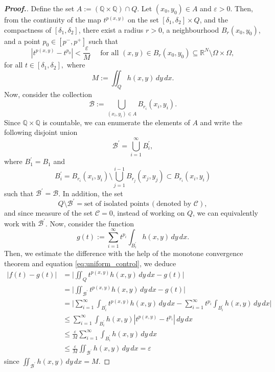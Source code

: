 \documentclass[11pt]{article}
\newcommand{\Q}{\textit{Q}}
\newcommand{\ds} {\displaystyle}
\begin{document}
\begin{proof}[\bf Proof.]
Define the set
$
A := (\mathbb{Q} \times \mathbb{Q}) \cap \Q.
$
Let \( (x_0, y_0) \in A \) and 
$\varepsilon > 0.$
Then, from the continuity of the map 
\( t^{p(x,y)} \) 
on the set 
\( [\delta_1, \delta_2] \times \Q \), 
and the compactness of 
\( [\delta_1, \delta_2] \), 
there exist a radius 
\( r > 0 \), a neighbourhood 
\( B_r(x_0, y_0) \), 
and a point $p_0 \in [p^-,p^+]$
such that
\begin{equation} \label{eq:uniform_control}
\left| t^{p(x,y)} - t^{p_0} \right| < 
\frac{\varepsilon}{M} \quad 
\text{ for all } (x,y) \in B_r(x_0, y_0)
 \subseteq \mathbb{R}^N 
 \setminus \Omega \times \Omega,  
\end{equation}
  for all 
$t \in [\delta_1, \delta_2],$
where 
$$
M := \ds\iint_{\Q} h(x,y) \, dy \, dx .
$$
Now, consider the collection
\begin{equation*}
\mathcal{B} := \bigcup_{(x_i, y_i) \in A}
 B_{r_i}(x_i, y_i).
\end{equation*}
Since 
\( \mathbb{Q} \times \mathbb{Q} \) 
is countable, we can enumerate the elements of 
\( A \) and write the following disjoint union
\begin{equation*}
\mathcal{B}^{\prime} = 
\bigcup_{i=1}^{\infty} B_i^{\prime},
\end{equation*}
where
$B_1^{\prime} = B_1$
and
$$
B_i^{\prime}= B_{r_i}(x_i,y_i) 
\setminus \bigcup_{j=1}^{i-1} B_{r_j}(x_j,y_j) 
\subset B_{r_i}(x_i,y_i)
$$
such that $\mathcal{B}^{\prime} = \mathcal{B}$.
In addition, the set
\begin{equation*}
\Q  \setminus \mathcal{B}^{\prime} 
= \text{set of isolated points}\,
(\text{denoted by } \mathcal{C}),
\end{equation*}
and since measure of the set 
\( \mathcal{C} = 0 \),
instead of working on 
\( \Q \),
we can equivalently work with
\( \mathcal{B}^{\prime} \).
Now, consider the function
\begin{equation*}
g(t) := \sum_{i=1}^\infty t^{p_i} 
\int_{B_i^{\prime}} h(x,y) \, dy \, dx.
\end{equation*}
Then, we estimate the difference with the 
help of the monotone convergence theorem 
and equation \eqref{eq:uniform_control},
 we deduce
\begin{align*} 
\left| f(t) - g(t) \right| 
 & =
  \Big | \iint_{\Q} t^{p(x,y)} h(x,y) \,
 dy \, dx - g(t) 
  \Big | \\
 & =  
 \Big | \iint_{\mathcal{B}^{\prime}} 
t^{p(x,y)} h(x,y) \, dy \, dx - g(t) 
 \Big | \\
 & = 
  \Big | \sum_{i=1}^{\infty} 
\int_{B_i^{\prime}} t^{p(x,y)} h(x,y) \, 
dy \, dx - \sum_{i=1}^{\infty} t^{p_i} 
\int_{B_i^{\prime}} h(x,y) \, dy \, dx 
 \Big |\\
 & \leq  \sum_{i=1}^\infty 
\int_{B_i^{\prime}} h(x,y) 
\left| t^{p(x,y)} - t^{p_i} \right| \, dy \, dx\\
 & \leq  
\frac{\varepsilon}{M} \sum_{i=1}^{\infty} 
\int_{B_i^{\prime}} h(x,y) \, dy \, dx\\
 & \leq  
\frac{\varepsilon}{M} 
\iint_{\mathcal{B}^{\prime}} h(x,y) \, dy \, dx 
= \varepsilon
\end{align*}
since \( \iint_{\mathcal{B}^{\prime}} h(x,y)
 \, dy \, dx = M \).


\end{proof}
\end{document}
